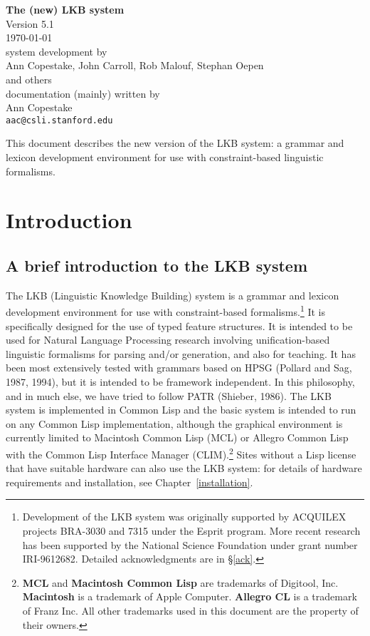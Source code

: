 \documentclass[12pt]{report}
\begin{document}
\vspace*{1in}
\begin{center}
{\Huge\bf The (new) LKB system}\\[0.2in]
Version 5.1\\[0.2in]
\today\\[1in]
system development by\\[0.2in]
{\Large Ann Copestake, John Carroll, Rob Malouf, Stephan Oepen\\ 
and others}\\[0.5in]
documentation (mainly) written by\\[0.2in]
{\Large Ann Copestake}\\
{\tt aac@csli.stanford.edu}\\[0.5in]
\end{center}
This document describes the new version of the LKB system:
a grammar and lexicon development environment for use with
constraint-based linguistic formalisms.

\tableofcontents

\chapter{Introduction}

\section{A brief introduction to the LKB system}

The LKB (Linguistic Knowledge Building)
system is a grammar and lexicon development environment for use with
constraint-based formalisms.\footnote{Development 
of the LKB system was originally supported by ACQUILEX projects
BRA-3030 and 7315 under the Esprit program.  More recent research
has been supported by the
National Science Foundation under grant number IRI-9612682.
Detailed acknowledgments are in \S\ref{ack}.}
It is specifically designed for the use of typed
feature structures.  It is intended to be used for Natural Language Processing
research involving unification-based linguistic formalisms for parsing and/or
generation, and also for teaching.  It has been most extensively tested with
grammars based on HPSG (Pollard and Sag, 1987, 1994), but it is intended to be
framework independent.  In this philosophy, and in much else, 
we have tried to follow PATR
(Shieber, 1986).  The LKB system is implemented in Common Lisp and the
basic system is intended to 
run on any Common Lisp implementation, although the
graphical environment is currently limited to Macintosh Common Lisp (MCL)
or Allegro Common Lisp with the Common Lisp Interface
Manager (CLIM).\footnote{{\bf MCL} and 
{\bf Macintosh Common Lisp} are trademarks of Digitool, Inc.
{\bf Macintosh} is a trademark of Apple Computer.
{\bf Allegro CL} is a trademark of Franz Inc.
All other trademarks used in this document are the property of their
owners.}
Sites without a Lisp license that have suitable hardware can 
also use the LKB system:
for details of hardware requirements and installation, 
see Chapter~\ref{installation}.
\end{document}

